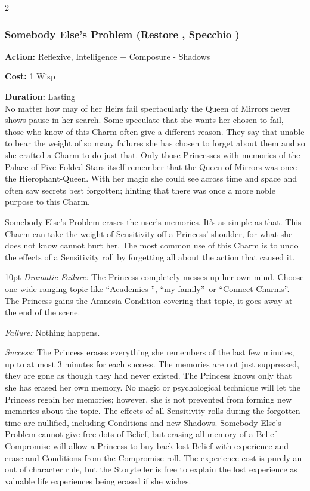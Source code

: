 \begin{multicols}{2}
\subsubsection*{Somebody Else's Problem (Restore \textbullet\textbullet\textbullet, Specchio \textbullet\textbullet)}

\noindent \textbf{Action:} Reflexive, Intelligence + Composure - Shadows

\noindent \textbf{Cost:} 1 Wisp

\noindent \textbf{Duration:} Lasting \\

No matter how may of her Heirs fail spectacularly the Queen of Mirrors never shows pause in her search. Some speculate that she wants her chosen to fail, those who know of this Charm often give a different reason. They say that unable to bear the weight of so many failures she has chosen to forget about them and so she crafted a Charm to do just that. Only those Princesses with memories of the Palace of Five Folded Stars itself remember that the Queen of Mirrors was once the Hierophant-Queen. With her magic she could see across time and space and often saw secrets best forgotten; hinting that there was once a more noble purpose to this Charm.

Somebody Else's Problem erases the user's memories. It's as simple as that. This Charm can take the weight of Sensitivity off a Princess' shoulder, for what she does not know cannot hurt her. The most common use of this Charm is to undo the effects of a Sensitivity roll by forgetting all about the action that caused it.

\begin{myindentpar}{10pt}    \emph{Dramatic Failure:} The Princess completely messes up her own mind. Choose one wide ranging topic like \textquotedblleft Academics \textquotedblright , \textquotedblleft my family\textquotedblright\, or \textquotedblleft Connect Charms\textquotedblright . The Princess gains the Amnesia Condition covering that topic, it goes away at the end of the scene.

    \emph{Failure:} Nothing happens.

    \emph{Success:} The Princess erases everything she remembers of the last few minutes, up to at most 3 minutes for each success. The memories are not just suppressed, they are gone as though they had never existed. The Princess knows only that she has erased her own memory. No magic or psychological technique will let the Princess regain her memories; however, she is not prevented from forming new memories about the topic.
    The effects of all Sensitivity rolls during the forgotten time are nullified, including Conditions and new Shadows. Somebody Else's Problem cannot give free dots of Belief, but erasing all memory of a Belief Compromise will allow a Princess to buy back lost Belief with experience and erase and Conditions from the Compromise roll. The experience cost is purely an out of character rule, but the Storyteller is free to explain the lost experience as valuable life experiences being erased if she wishes.


\end{myindentpar}
\end{multicols}
